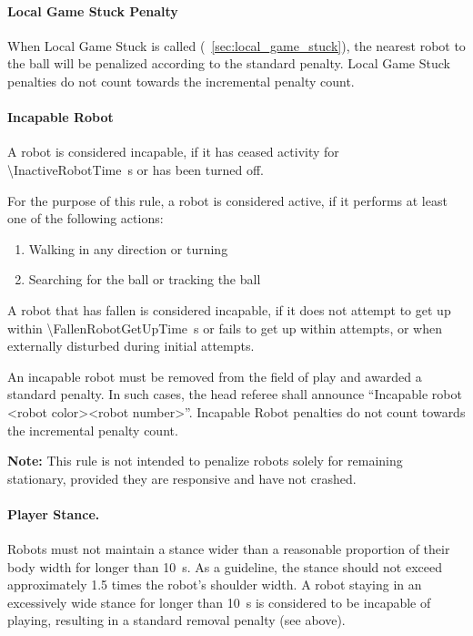 \paragraph{Local Game Stuck Penalty}
\label{sec:pen_local_game_stuck}

When Local Game Stuck is called (\cf~\cref{sec:local_game_stuck}), the nearest robot to the ball will be penalized according to the standard penalty. Local Game Stuck penalties do not count towards the incremental penalty count.

\paragraph{Incapable Robot}
\label{sec:incapable_robot}
A robot is considered incapable, if it has ceased activity for \qty{\InactiveRobotTime}{\second} or has been turned off. 

For the purpose of this rule, a robot is considered active, if it performs at least one of the following actions:

\begin{enumerate}
	\item Walking in any direction or turning
	\item Searching for the ball or tracking the ball
\end{enumerate}

A robot that has fallen is considered incapable, if it does not attempt to get up within \qty{\FallenRobotGetUpTime}{\second} or fails to get up within \FallenRobotGetUpAttempts{} attempts, or \FallenRobotGetUpAttemptsDisturbed{} when externally disturbed during initial attempts.

An incapable robot must be removed from the field of play and awarded a standard penalty. In such cases, the head referee shall announce ``Incapable robot \textless robot color\textgreater \textless robot number\textgreater''. Incapable Robot penalties do not count towards the incremental penalty count.

\textbf{Note:} This rule is not intended to penalize robots solely for remaining stationary, provided they are responsive and have not crashed.

\paragraph*{Player Stance.}
\label{sec:player_stance}

Robots must not maintain a stance wider than a reasonable proportion of their body width for longer than \qty{10}{\second}. As a guideline, the stance should not exceed approximately 1.5 times the robot's shoulder width. A robot staying in an excessively wide stance for longer than \qty{10}{\second} is considered to be incapable of playing, resulting in a standard removal penalty (see above).

